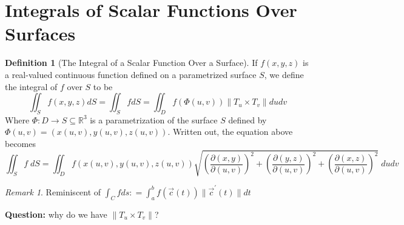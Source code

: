 \documentclass[12pt]{book}
\theoremstyle{definition}
\newtheorem{definition}{Definition}[section]
\theoremstyle{remark}
\newtheorem*{remark}{Remark}
\begin{document}
\section{Integrals of Scalar Functions Over Surfaces}
\begin{definition}
  [The Integral of a Scalar Function Over a Surface]
If $f (x, y, z)$ is a real-valued continuous function defined on a parametrized surface $S$, we define the integral of $f$ over $S$ to be
  $$\iint_S f(x,y,z) dS = \iint_S f d S = \iint_D f(\Phi (u,v)) 
  \| T_u \times T_v \| du dv $$
  Where $\Phi: D \to S \subseteq \mathbb{R}^3$ is a parametrization of the surface $S$ defined by $\Phi(u,v) = (x(u,v), y(u,v), z(u,v)). $ 
  Written out, the equation above becomes 
  $$\iint_S f \; dS = \iint_D f( x(u,v), y (u,v), z(u,v)) \sqrt{\left( \frac{\partial {(x,y)}}{\partial {(u,v)}} \right)^2 + \left( \frac{\partial {(y,z)}}{\partial {(u,v)}} \right)^2 + \left(\frac{\partial {(x,z)}}{\partial {(u,v)}}\right)^2 } \;dudv $$
\end{definition}
\begin{remark} 
  Reminiscent of $\int_C f ds : = \int_a^b f(\vec c(t)) \| \vec c^\prime (t)\| dt$
\end{remark}
\noindent \textbf{Question:} why do we have $\| T_u \times T_v\|$?  
\end{document}
